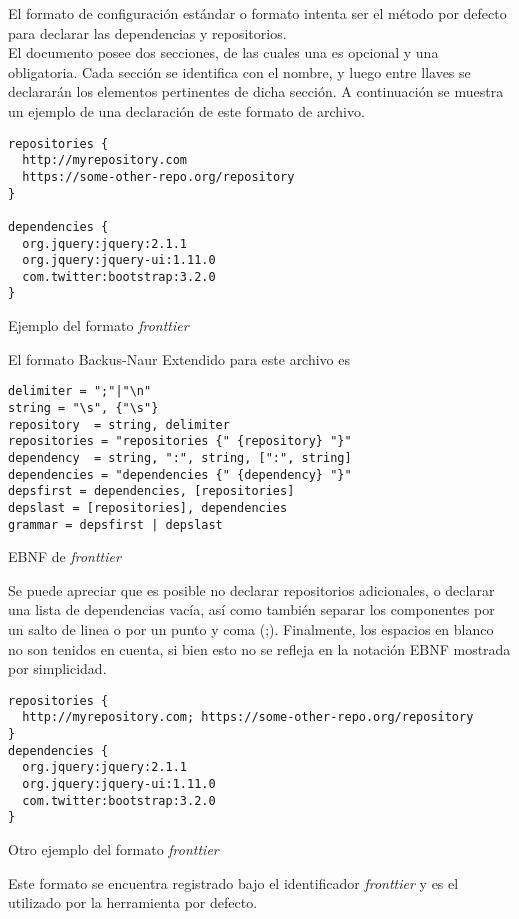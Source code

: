 El formato de configuración estándar o formato \fronttier intenta ser el método
por defecto para declarar las dependencias y repositorios.\\
El documento posee dos secciones, de las cuales una es opcional y una
obligatoria. Cada sección se identifica con el nombre, y luego entre llaves
se declararán los elementos pertinentes de dicha sección. A continuación se muestra
un ejemplo de una declaración de este formato de archivo.
\begin{listing}[ht]
\begin{verbatim}
repositories {
  http://myrepository.com
  https://some-other-repo.org/repository
}

dependencies {
  org.jquery:jquery:2.1.1
  org.jquery:jquery-ui:1.11.0
  com.twitter:bootstrap:3.2.0
}
\end{verbatim}
\caption{Ejemplo del formato \emph{fronttier}}
\label{guide:fronttier:sample}
\end{listing}
El formato Backus-Naur Extendido para este archivo es
\begin{listing}[ht]
\begin{verbatim}
delimiter = ";"|"\n"
string = "\s", {"\s"}
repository	= string, delimiter
repositories = "repositories {" {repository} "}"
dependency	= string, ":", string, [":", string]
dependencies = "dependencies {" {dependency} "}"
depsfirst = dependencies, [repositories]
depslast = [repositories], dependencies
grammar = depsfirst | depslast
\end{verbatim}
\caption{EBNF de \emph{fronttier}}
\label{guide:fronttier:ebnf}
\end{listing}
Se puede apreciar que es posible no declarar repositorios adicionales, o declarar una
lista de dependencias vacía, así como también separar los componentes por un salto de
linea o por un punto y coma (;). Finalmente, los espacios en blanco no son tenidos en
cuenta, si bien esto no se refleja en la notación EBNF mostrada por simplicidad.
\begin{listing}[ht]
\begin{verbatim}
repositories {
  http://myrepository.com; https://some-other-repo.org/repository
}
dependencies {
  org.jquery:jquery:2.1.1
  org.jquery:jquery-ui:1.11.0
  com.twitter:bootstrap:3.2.0
}
\end{verbatim}
\caption{Otro ejemplo del formato \emph{fronttier}}
\label{guide:fronttier:sample_two}
\end{listing}
Este formato se encuentra registrado bajo el identificador \emph{fronttier}
y es el utilizado por la herramienta por defecto.

